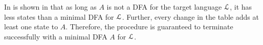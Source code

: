 In is shown in \cite{Angluin87} that as long as $A$ is not a DFA for the target language $\cal L$, it has less states than a minimal DFA for $\cal L$. Further, every change in the table adds at least one state to $A$. Therefore, the procedure is guaranteed to terminate successfully with a minimal DFA $A$ for $\cal L$. 